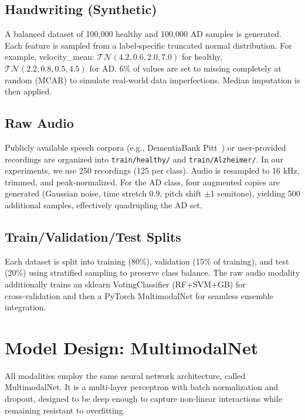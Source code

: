 \documentclass[conference]{IEEEtran}
\begin{document}
\subsection{Handwriting (Synthetic)}
A balanced dataset of 100,000 healthy and 100,000 AD samples is generated. Each feature is sampled from a label‑specific truncated normal distribution. For example, velocity\_mean: $\mathcal{TN}(4.2,0.6,2.0,7.0)$ for healthy, $\mathcal{TN}(2.2,0.8,0.5,4.5)$ for AD. 6\% of values are set to missing completely at random (MCAR) to simulate real‑world data imperfections. Median imputation is then applied.

\subsection{Raw Audio}
Publicly available speech corpora (e.g., DementiaBank Pitt~\cite{becker1994}) or user‑provided recordings are organized into \texttt{train/healthy/} and \texttt{train/Alzheimer/}. In our experiments, we use 250 recordings (125 per class). Audio is resampled to 16 kHz, trimmed, and peak‑normalized. For the AD class, four augmented copies are generated (Gaussian noise, time stretch 0.9, pitch shift $\pm$1 semitone), yielding 500 additional samples, effectively quadrupling the AD set.

\subsection{Train/Validation/Test Splits}
Each dataset is split into training (80\%), validation (15\% of training), and test (20\%) using stratified sampling to preserve class balance. The raw audio modality additionally trains an sklearn VotingClassifier (RF+SVM+GB) for cross‑validation and then a PyTorch MultimodalNet for seamless ensemble integration.

\section{Model Design: MultimodalNet}
All modalities employ the same neural network architecture, called MultimodalNet. It is a multi‑layer perceptron with batch normalization and dropout, designed to be deep enough to capture non‑linear interactions while remaining resistant to overfitting.
\end{document}
